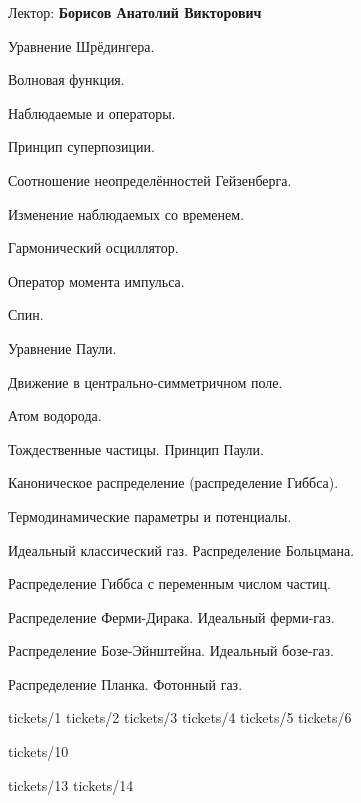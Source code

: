 \documentclass[specialist, subf, href, colorlinks=true, 12pt, times, mtpro, final]{disser}
\begin{document}
\tableofcontents

\newpage
{}
\noindent Лектор: {\bf Борисов Анатолий Викторович}\\

\begin{enumerate}
{\footnotesize
\item Уравнение Шрёдингера.
\item Волновая функция.
\item Наблюдаемые и операторы.
\item Принцип суперпозиции.
\item Соотношение неопределённостей Гейзенберга.
\item Изменение наблюдаемых со временем.
\item Гармонический осциллятор.
\item Оператор момента импульса.
\item Спин.
\item Уравнение Паули.
\item Движение в центрально-симметричном поле.
\item Атом водорода.
\item Тождественные частицы. Принцип Паули.
\item Каноническое распределение (распределение Гиббса).
\item Термодинамические параметры и потенциалы.
\item Идеальный классический газ. Распределение Больцмана. 
\item Распределение Гиббса с переменным числом частиц. 
\item Распределение Ферми-Дирака. Идеальный ферми-газ.
\item Распределение Бозе-Эйнштейна. Идеальный бозе-газ.
\item Распределение Планка. Фотонный газ.
}
\end{enumerate}

 {tickets/1}
 {tickets/2}
 {tickets/3}
 {tickets/4}
 {tickets/5}
 {tickets/6}

 {tickets/10}

 {tickets/13}
 {tickets/14}
 
\end{document}
